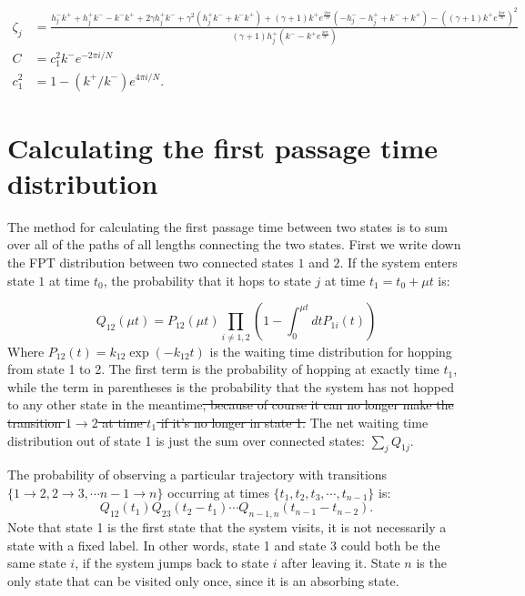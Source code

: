 \documentclass[amsmath, preprintnumbers, 10pt, twocolumn, pre, bibliograpy]{revtex4-1}
\providecommand{\DIFadd}[1]{{\protect\color{blue}\uwave{#1}}} %
\providecommand{\DIFdel}[1]{{\protect\color{red}\sout{#1}}}                      %
\providecommand{\DIFaddbegin}{} %
\providecommand{\DIFaddend}{} %
\providecommand{\DIFdelbegin}{} %
\providecommand{\DIFdelend}{} %
\newcommand{\DIFscaledelfig}{0.5}
\newlength{\DIFdelgraphicswidth} %
\newlength{\DIFdelgraphicsheight} %
\newcommand{\DIFaddincludegraphics}[2][]{{\color{blue}\fbox{\DIFOincludegraphics[#1]{#2}}}} %
\newcommand{\DIFdelincludegraphics}[2][]{%
\sbox{\DIFdelgraphicsbox}{\DIFOincludegraphics[#1]{#2}}%
\settoboxwidth{\DIFdelgraphicswidth}{\DIFdelgraphicsbox} %
\settoboxtotalheight{\DIFdelgraphicsheight}{\DIFdelgraphicsbox} %
\scalebox{\DIFscaledelfig}{%
\parbox[b]{\DIFdelgraphicswidth}{\usebox{\DIFdelgraphicsbox}\\[-\baselineskip] \rule{\DIFdelgraphicswidth}{0em}}\llap{\resizebox{\DIFdelgraphicswidth}{\DIFdelgraphicsheight}{%
\setlength{\unitlength}{\DIFdelgraphicswidth}%
\begin{picture}(1,1)%
\thicklines\linethickness{2pt} %
{\color[rgb]{1,0,0}\put(0,0){\framebox(1,1){}}}%
{\color[rgb]{1,0,0}\put(0,0){\line( 1,1){1}}}%
{\color[rgb]{1,0,0}\put(0,1){\line(1,-1){1}}}%
\end{picture}%
}\hspace*{3pt}}} %
} %
\DeclareRobustCommand{\DIFaddbegin}{\DIFOaddbegin \let\includegraphics\DIFaddincludegraphics} %
\DeclareRobustCommand{\DIFaddend}{\DIFOaddend \let\includegraphics\DIFOincludegraphics} %
\DeclareRobustCommand{\DIFdelbegin}{\DIFOdelbegin \let\includegraphics\DIFdelincludegraphics} %
\DeclareRobustCommand{\DIFdelend}{\DIFOaddend \let\includegraphics\DIFOincludegraphics} %
\begin{document}
\begin{widetext}
\begin{align}
\zeta_j &=  \frac{{h_j^-} {k^+}+{h_j^+} {k^-}-{k^-} {k^+} + 2 \gamma  {h_j^+} {k^-} +\gamma ^2 \left({h_j^+} {k^-} + {k^-} {k^+} \right) + (\gamma +1) {k^+} e^{\frac{2 i \pi }{N}} (-{h_j^-}-{h_j^+}+{k^-}+{k^+})-\left((\gamma +1) {k^+} e^{\frac{2 i \pi }{N}}\right)^2}{(\gamma +1) {h_j^+} \left({k^-}-{k^+} e^{\frac{4 i \pi }{N}}\right)} \label{eq:zeta} \\
C &=  c_1^2 k^- e^{-2\pi i/N} \label{eq:c} \\
c_1^2 & = 1-(k^+/k^-)e^{4\pi i/N}. \label{eq:c1sq}
\end{align}
\end{widetext}

\section{Calculating the first passage time distribution}\label{app:fpt}

The method for calculating the first passage time between two states is to sum over all of the paths of all lengths connecting the two states.  First we write down the FPT distribution between two connected states $1$ and $2$. If the system enters state $1$ at time $t_0$, the probability that it hops to state $j$ at time $t_1 = t_0 + \mu  t$ is:

\begin{equation}
Q_{12}(\mu  t)  = P_{12}(\mu  t) \prod_{i \neq 1, 2}\left( 1 - \int_0^{\mu  t} dt P_{1i}(t) \right)
\end{equation}
Where $P_{12}(t) = k_{12}\exp(-k_{12}t)$ is the waiting time distribution for hopping from state 1 to 2. The first term is the probability of hopping at exactly time $t_1$, while the term in parentheses is the probability that the system has not hopped to any other state in the meantime\DIFdelbegin \DIFdel{, because of course it can no longer make the transition $1 \to 2$ at time $t_1$ if it's no longer in state 1. }\DIFdelend \DIFaddbegin \DIFadd{. }\DIFaddend The net waiting time distribution out of state 1 is just the sum over connected states: $\sum_j Q_{1j}$. 

The probability of observing a particular trajectory with transitions \DIFdelbegin \DIFdel{$\{1\to 2, 2 \to 3, \cdots n-1\to n\}$ }\DIFdelend \DIFaddbegin \DIFadd{$\{1\to 2, 2 \to 3, \cdots, n-1\to n\}$ }\DIFaddend occurring at times $\{t_1, t_2, t_3, \cdots, t_{n-1}\}$ is:
\begin{equation}
Q_{12}(t_1)Q_{23}(t_2-t_1)\cdots Q_{n-1, n}(t_{n-1} - t_{n-2}).
\end{equation}
Note that state 1 is the first state that the system visits, it is not necessarily a state with a fixed label. In other words, state 1 and state 3 could both be the same state $i$, if the system jumps back to state $i$ after leaving it. State $n$ is the only state that can be visited only once, since it is an absorbing state. 
\end{document}
